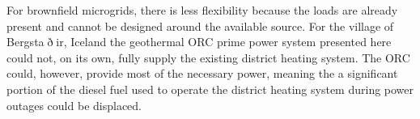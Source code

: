 For brownfield microgrids, there is less flexibility because the loads are already present and cannot be designed around the available source. For the village of Bergsta$\eth$ir, Iceland the geothermal ORC prime power system presented here could not, on its own, fully supply the existing district heating system. The ORC could, however, provide most of the necessary power, meaning the a significant portion of the diesel fuel used to operate the district heating system during power outages could be displaced.

\cleardoublepage

